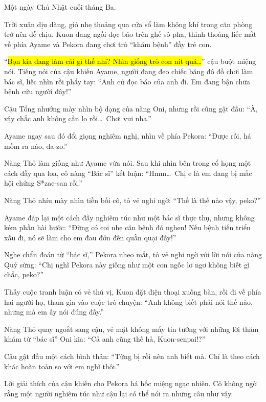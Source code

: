 \documentclass[../main.tex]{subfiles}
\begin{document}
Một ngày Chủ Nhật cuối tháng Ba.

Trời xuân dịu dàng, gió nhẹ thoảng qua cửa sổ làm không khí trong căn phòng trở nên dễ chịu. Kuon đang ngồi đọc báo trên ghế sô-pha, thỉnh thoảng liếc mắt về phía Ayame và Pekora đang chơi trò ``khám bệnh'' đầy trẻ con.

``\hl{Bọn kia đang làm cái gì thế nhỉ? Nhìn giống trò con nít quá\dots}'' cậu buột miệng nói. Tiếng nói của cậu khiến Ayame, người đang đeo chiếc băng đô đồ chơi làm bác sĩ, liếc nhìn rồi phẩy tay: ``Anh cứ đọc báo của anh đi. Em đang bận chữa bệnh cứu người đây!''

Cậu Tổng nhướng mày nhìn bộ dạng của nàng Oni, nhưng rồi cũng gật đầu: ``À, vậy chắc anh không cần lo rồi\dots\ Chơi vui nha.''

Ayame ngay sau đó đổi giọng nghiêm nghị, nhìn về phía Pekora: ``Được rồi, há mồm ra nào, da-zo.''


Nàng Thỏ làm giống như Ayame vừa nói. Sau khi nhìn bên trong cổ họng một cách đầy qua loa, cô nàng ``Bác sĩ'' kết luận: ``Hmm\dots\ Chị e là em đang bị mắc hội chứng S*zae-san rồi.''

Nàng Thỏ nhíu mày nhìn tiền bối cô, tỏ vẻ nghi ngờ: ``Thế là thế nào vậy, peko?''

Ayame đáp lại một cách đầy nghiêm túc như một bác sĩ thực thụ, nhưng không kém phần hài hước: ``Đừng có coi nhẹ căn bệnh đó nghen! Nếu bệnh tiến triển xấu đi, nó sẽ làm cho em đau đớn đến quằn quại đấy!''

Nghe chẩn đoán từ ``bác sĩ,'' Pekora nheo mắt, tỏ vẻ nghi ngờ với lời nói của nàng Quỷ sừng: ``Chị nghĩ Pekora này giống như một con ngốc lơ ngơ không biết gì chắc, peko?''


Thấy cuộc tranh luận có vẻ thú vị, Kuon đặt điện thoại xuống bàn, rồi đi về phía hai người họ, tham gia vào cuộc trò chuyện: ``Anh không biết phải nói thế nào, nhưng mà em ấy nói đúng đấy.''

Nàng Thỏ quay ngoắt sang cậu, vẻ mặt không mấy tin tưởng với những lời thăm khám từ ``bác sĩ'' Oni kia: ``Cả anh cũng thế hả, Kuon-senpai!?''

Cậu gật đầu một cách bình thản: ``Từng bị rồi nên anh biết mà. Chỉ là theo cách khác hoàn toàn so với em nghĩ thôi.''

Lời giải thích của cậu khiến cho Pekora há hốc miệng ngạc nhiên. Cô không ngờ rằng một người nghiêm túc như cậu lại có thể nói ra những câu như vậy.
\end{document}
